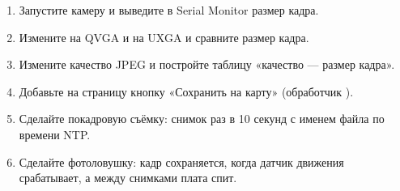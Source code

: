 \begin{tasks}
\begin{enumerate}
\item {} Запустите камеру и выведите в Serial Monitor размер кадра.
\item {} Измените  на QVGA и на UXGA и сравните размер кадра.
\item {} Измените качество JPEG и постройте таблицу «качество --- размер кадра».
\item {} Добавьте на страницу кнопку «Сохранить на карту» (обработчик ).
\item {} Сделайте покадровую съёмку: снимок раз в 10 секунд с именем файла по времени NTP.
\item {} Сделайте фотоловушку: кадр сохраняется, когда датчик движения срабатывает, а между снимками плата спит.
\end{enumerate}
\end{tasks}
